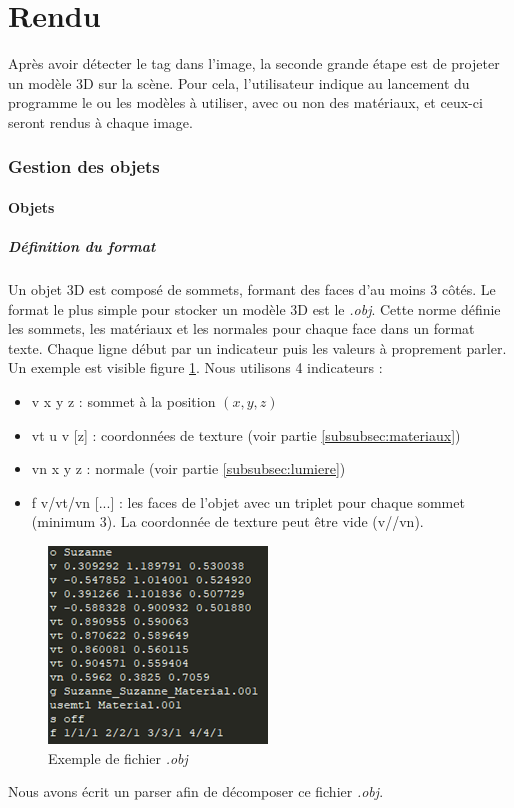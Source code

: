 \newpage
\part{Rendu}
    Après avoir détecter le tag dans l'image, la seconde grande étape est de projeter un modèle 3D sur la scène. Pour cela, l'utilisateur indique au lancement du programme le ou les modèles à utiliser, avec ou non des matériaux, et ceux-ci seront rendus à chaque image.

    \section{Gestion des objets}

        \subsection{Objets}

            \subsubsection{Définition du format}                
                Un objet 3D est composé de sommets, formant des faces d'au moins 3 côtés. Le format le plus simple pour stocker un modèle 3D est le \emph{.obj}. Cette norme définie les sommets, les matériaux et les normales pour chaque face dans un format texte. Chaque ligne début par un indicateur puis les valeurs à proprement parler. Un exemple est visible figure \ref{fig:obj}. Nous utilisons 4 indicateurs :
                \begin{itemize}
                    \item v x y z : sommet à la position $(x, y, z)$
                    \item vt u v [z] : coordonnées de texture (voir partie \ref{subsubsec:materiaux})
                    \item vn x y z : normale (voir partie \ref{subsubsec:lumiere})
                    \item f v/vt/vn [...] : les faces de l'objet avec un triplet pour chaque sommet (minimum 3). La coordonnée de texture peut être vide (v//vn).
                \end{itemize}
                
                \begin{figure}[h]
                    \centering
                    \includegraphics[scale=0.8]{img/rendu/obj.png}
                    \caption{Exemple de fichier \emph{.obj}}
                    \label{fig:obj}
                \end{figure}
                Nous avons écrit un parser afin de décomposer ce fichier \emph{.obj}.

